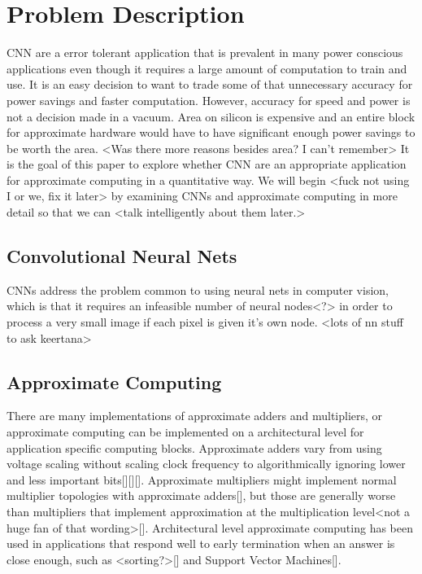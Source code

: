 \documentclass[conference]{IEEEtran}
\begin{document}
\section{Problem Description}
CNN are a error tolerant application that is prevalent in many power conscious applications even though it requires a large amount of computation to train and use. It is an easy decision to want to trade some of that unnecessary accuracy for power savings and faster computation. However, accuracy for speed and power is not a decision made in a vacuum. Area on silicon is expensive and an entire block for approximate hardware would have to have significant enough power savings to be worth the area. <Was there more reasons besides area? I can't remember> It is the goal of this paper to explore whether CNN are an appropriate application for approximate computing in a quantitative way. We will begin <fuck not using I or we, fix it later> by examining CNNs and approximate computing in more detail so that we can <talk intelligently about them later.>
\subsection{Convolutional Neural Nets}
CNNs address the problem common to using neural nets in computer vision, which is that it requires an infeasible number of neural nodes<?> in order to process a very small image if each pixel is given it's own node. <lots of nn stuff to ask keertana>
\subsection{Approximate Computing}
There are many implementations of approximate adders and multipliers, or approximate computing can be implemented on a architectural level for application specific computing blocks. Approximate adders vary from using voltage scaling without scaling clock frequency to algorithmically ignoring lower and less important bits[][][]. Approximate multipliers might implement normal multiplier topologies with approximate adders[], but those are generally worse than multipliers that implement approximation at the multiplication level<not a huge fan of that wording>[]. Architectural level approximate computing has been used in applications that respond well to early termination when an answer is close enough, such as <sorting?>[] and Support Vector Machines[].
\end{document}
